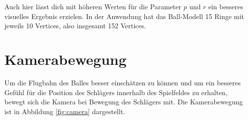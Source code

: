 Auch hier lässt dich mit höheren Werten für die Parameter $p$ und $r$ ein besseres visuelles Ergebnis erzielen. In der Anwendung hat das Ball-Modell 15 Ringe mit jeweils 10 Vertices, also insgesamt 152 Vertices.

\section{Kamerabewegung}
%
Um die Flugbahn des Balles besser einschätzen zu können und um ein besseres Gefühl für die
Position des Schlägers innerhalb des Spielfeldes zu erhalten, bewegt sich die Kamera bei Bewegung des Schlägers mit. Die Kamerabewegung ist in Abbildung \ref{fig:camera} dargestellt.

